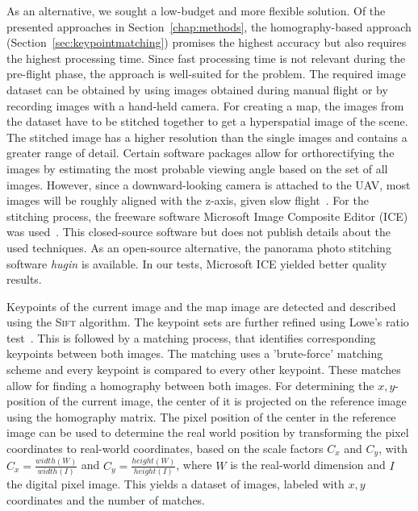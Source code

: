 \documentclass{report}
\begin{document}
As an alternative, we sought a low-budget and more flexible
solution. Of the presented approaches in Section~\ref{chap:methods},
the homography-based approach (Section~\ref{sec:keypointmatching})
promises the highest accuracy but also requires the highest processing
time. Since fast processing time is not relevant during the pre-flight
phase, the approach is well-suited for the problem.
The required image dataset can be obtained by using images obtained
during manual flight or by recording images with a hand-held
camera. For creating a map, the images from the dataset have to be
stitched together to get a hyperspatial image of the scene. The
stitched image has a higher resolution than the single images and
contains a greater range of detail.  Certain software packages allow
for orthorectifying the images by estimating the most probable viewing
angle based on the set of all images. However, since a
downward-looking camera is attached to the UAV, most images will be
roughly aligned with the z-axis, given slow
flight~\cite{blosch2010vision}.  For the stitching process, the
freeware software Microsoft Image Composite Editor (ICE) was
used~\cite{ice}. This closed-source software but does not publish
details about the used techniques. As an open-source alternative, the
panorama photo stitching software \emph{hugin} is available. In our
tests, Microsoft ICE yielded better quality results.

Keypoints of the current image and the map image are detected and
described using the \textsc{Sift} algorithm. The keypoint sets are
further refined using Lowe's ratio test~\cite{lowe1999object}. This is
followed by a matching process, that identifies corresponding
keypoints between both images. The matching uses a 'brute-force'
matching scheme and every keypoint is compared to every other
keypoint. These matches allow for finding a homography between both
images. For determining the $x, y$-position of the current image, the
center of it is projected on the reference image using the homography
matrix. The pixel position of the center in the reference image can be
used to determine the real world position by transforming the pixel
coordinates to real-world coordinates, based on the scale factors
$C_x$ and $C_y$, with $C_x = \frac{width(W)}{width(I)}$ and
$C_y = \frac{height(W)}{height(I)}$, where $W$ is the real-world
dimension and $I$ the digital pixel image. This yields a dataset of
images, labeled with $x, y$ coordinates and the number of matches.
\end{document}
